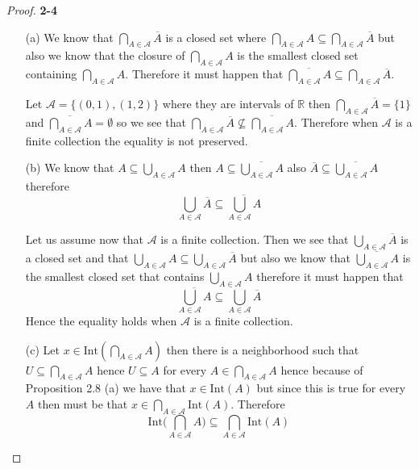 \documentclass[11pt]{article}
\newcommand{\R}{\mathbb{R}}
\newcommand{\inter}{\text{Int}}
\theoremstyle{definition}
\begin{document}
\begin{proof}{\textbf{2-4}}
    \begin{itemize}
    \item [(a)] We know that $\bigcap_{A \in \mathcal{A}} \overline{A}$ is 
    a closed set where
    $\bigcap_{A \in \mathcal{A}} A \subseteq \bigcap_{A \in \mathcal{A}} \overline{A}$
    but also we know that the closure of $\bigcap_{A \in \mathcal{A}} A$ is the
    smallest closed set containing $\bigcap_{A \in \mathcal{A}} A$. Therefore
    it must happen that
    $\overline{\bigcap_{A \in \mathcal{A}} A} \subseteq \bigcap_{A \in \mathcal{A}} \overline{A}$.

    Let $\mathcal{A} = \{(0,1), (1, 2)\}$ where they are intervals of $\R$ then
    $\bigcap_{A \in \mathcal{A}} \overline{A} = \{1\}$ and
    $\overline{\bigcap_{A \in \mathcal{A}} A} = \emptyset$ so we see that
    $\bigcap_{A \in \mathcal{A}} \overline{A}
    \not\subseteq \overline{\bigcap_{A \in \mathcal{A}} A}$. Therefore when
    $\mathcal{A}$ is a finite collection the equality is not preserved.

    \item [(b)] We know that $A \subseteq \bigcup_{A \in \mathcal{A}} A$ then
    $A \subseteq \overline{\bigcup_{A \in \mathcal{A}} A}$ also
    $\overline{A} \subseteq \overline{\bigcup_{A \in \mathcal{A}} A}$ therefore
    $$\bigcup_{A \in \mathcal{A}} \overline{A}
    \subseteq \overline{\bigcup_{A \in \mathcal{A}} A}$$

    Let us assume now that $\mathcal{A}$ is a finite collection. Then
    we see that $\bigcup_{A \in \mathcal{A}} \overline{A}$ is a closed set 
    and that
    $\bigcup_{A \in \mathcal{A}} A
    \subseteq \bigcup_{A \in \mathcal{A}} \overline{A}$
    but also we know that $\overline{\bigcup_{A \in \mathcal{A}} A}$ is the
    smallest closed set that contains $\bigcup_{A \in \mathcal{A}} A$ therefore
    it must happen that 
    $$\overline{\bigcup_{A \in \mathcal{A}} A}
    \subseteq \bigcup_{A \in \mathcal{A}} \overline{A}$$
    Hence the equality holds when $\mathcal{A}$ is a finite collection.

    \item [(c)] Let $x \in \inter(\bigcap_{A \in \mathcal{A}} A)$ then there is
    a neighborhood such that $U \subseteq \bigcap_{A \in \mathcal{A}} A$ hence
    $U \subseteq A$ for every $A \in \bigcap_{A \in \mathcal{A}} A$ hence
    because of Proposition 2.8 (a) we have that $x \in \inter(A)$ but since
    this is true for every $A$ then must be that 
    $x \in \bigcap_{A \in \mathcal{A}} \inter(A)$. Therefore
    $$\inter\bigg(\bigcap_{A \in \mathcal{A}} A\bigg)
    \subseteq \bigcap_{A \in \mathcal{A}} \inter(A)$$


\end{itemize}
\end{proof}
\end{document}
